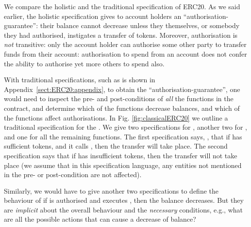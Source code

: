 We  compare the holistic and the traditional specification of ERC20.
As we said earlier,  the holistic specification gives to account holders an
 ``authorisation-guarantee'': their balance cannot decrease unless they
 themselves, or somebody they had authorised, instigates a transfer of
 tokens. Moreover, authorisation is {\em not} transitive: only the
 account holder can authorise some other party to transfer funds from
 their account: authorisation to spend from an account does not confer
 the ability to authorise yet more others to spend also.
 
 With traditional  specifications, such as is shown in Appendix~\ref{sect:ERC20:appendix}, to obtain the ``authorisation-guarantee'', 
one would need to inspect the pre- and post-conditions of {\em all} the functions
in the contract, and determine which of the functions decrease balances, and which of the functions 
 affect authorisations.
In Fig. \ref{fig:classicalERC20} we outline a traditional specification for the .
We give two specifications for , another two for , and one for all 
the remaining functions. The  first specification says, \eg, that if  
  has sufficient tokens, and it calls , then the transfer will take place.  
The second specification says that  if  has insufficient tokens, then 
the transfer will not take place (we assume that in this
specification language, any entities not mentioned in the pre- or post-condition 
are not affected).
 
 Similarly, we would have to give another two specifications to define the behaviour of 
if  is authorised and executes , then   the balance decreases. 
But they are {\em implicit} about the overall behaviour and the   {\em necessary} conditions,
e.g., what are all the possible actions that can cause a decrease of balance?

